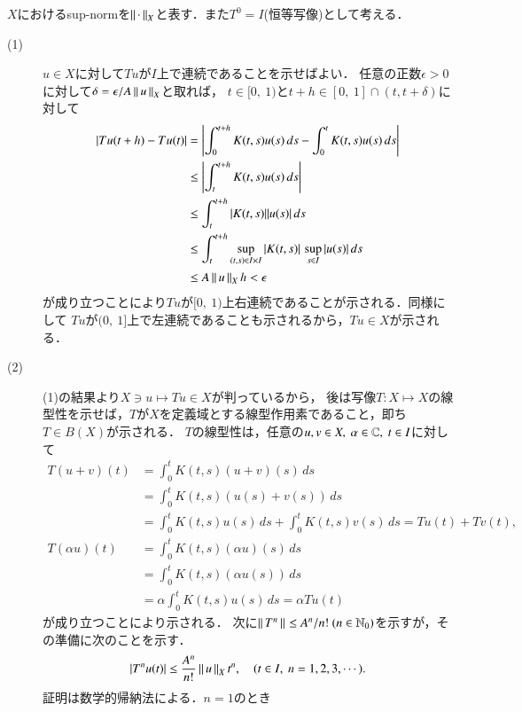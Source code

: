 \begin{prf}
	$X$におけるsup-normを$\left\|\, \cdot\, \right\|_{X}$と表す．また$T^0 = I$(恒等写像)として考える．
\begin{description}
	\item[(1)] $u \in X$に対して$Tu$が$I$上で連続であることを示せばよい．
		任意の正数$\epsilon > 0$に対して$\delta = \epsilon/{A\left\|\, u\, \right\|_{X}}$と取れば，
		$t \in [0,\ 1)$と$t+h \in [0,\ 1] \cap (t,t+\delta)$に対して
		\begin{align}
			|Tu(t + h) - Tu(t)| 
			&= \left|\int_{0}^{t+h} K(t,s)u(s)\, ds - \int_{0}^{t} K(t,s)u(s)\, ds \right| \\
			&\leq \left|\int_{t}^{t+h} K(t,s)u(s)\, ds \right| \\
			&\leq \int_{t}^{t+h} |K(t,s)||u(s)|\, ds \\
			&\leq \int_{t}^{t+h} \operatorname*{sup}_{(t,s)\in I \times I} |K(t,s)|\, \operatorname*{sup}_{s \in I} |u(s)|\, ds \\
			&\leq A \left\|\, u\, \right\|_{X} h < \epsilon
		\end{align}
		が成り立つことにより$Tu$が$[0,\ 1)$上右連続であることが示される．同様にして
		$Tu$が$(0,\ 1]$上で左連続であることも示されるから，$Tu \in X$が示される．
	\item[(2)] (1)の結果より$X \ni u \longmapsto Tu \in X$が判っているから，
		後は写像$T:X \longmapsto X$の線型性を示せば，$T$が$X$を定義域とする線型作用素であること，即ち$T \in B(X)$が示される．
		$T$の線型性は，任意の$u, v \in X,\ \alpha \in \mathbb{C},\ t \in I$に対して
		\begin{align}
			T(u+v)(t) &= \int_{0}^{t} K(t,s)(u+v)(s)\, ds \\
			&= \int_{0}^{t} K(t,s)(u(s) + v(s))\, ds \\
			&= \int_{0}^{t} K(t,s)u(s)\, ds + \int_{0}^{t} K(t,s)v(s)\, ds = Tu(t) + Tv(t), \\
			T(\alpha u)(t) &= \int_{0}^{t} K(t,s)(\alpha u)(s)\, ds \\
			&= \int_{0}^{t} K(t,s)(\alpha u(s))\, ds \\
			&= \alpha\int_{0}^{t} K(t,s)u(s)\, ds = \alpha Tu(t)
		\end{align}
		が成り立つことにより示される．
		次に$\left\|\, T^n\, \right\|_{} \leq A^n/n!\ (n \in \mathbb{N}_0)$を示すが，その準備に次のことを示す．
		\begin{align}
			|T^nu(t)| \leq \frac{A^n}{n!}\Norm{u}{X}t^n, \quad(t \in I,\ n=1,2,3,\cdots). \label{eq:func_analy_induction}
		\end{align}
		証明は数学的帰納法による．$n=1$のとき
		\begin{align}

\end{align}
\end{description}
\end{prf}
